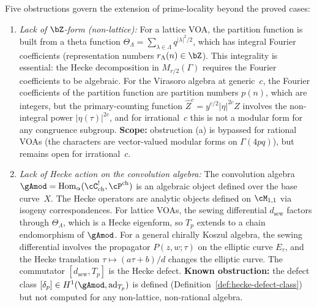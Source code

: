 \begin{theorem}%
\label{thm:prime-locality-obstructions}%
Five obstructions govern the extension of prime-locality beyond the
proved cases:
\begin{enumerate}[label=\textup{(\alph*)}]
\item \emph{Lack of $\bZ$-form \textup{(}non-lattice\textup{):}}
 For a lattice VOA, the partition function is built from a theta
 function $\Theta_\Lambda = \sum_{\lambda\in\Lambda} q^{|\lambda|^2/2}$,
 which has integral Fourier coefficients
 \textup{(}representation numbers $r_\Lambda(n) \in \bZ$\textup{)}.
 This integrality is essential: the Hecke decomposition in
 $M_{r/2}(\Gamma)$ requires the Fourier coefficients to be
 algebraic. For the Virasoro algebra at generic~$c$, the
 Fourier coefficients of the partition function are partition
 numbers $p(n)$, which are integers, but the primary-counting
 function $\widehat{Z}^c = y^{c/2}|\eta|^{2c}Z$ involves the
 non-integral power $|\eta(\tau)|^{2c}$, and for irrational~$c$
 this is not a modular form for any congruence subgroup.
 \textbf{Scope:} obstruction (a) is bypassed for rational VOAs
 \textup{(}the characters are vector-valued modular forms on
 $\Gamma(4pq)$\textup{)}, but remains open for
 irrational~$c$.

\item \emph{Lack of Hecke action on the convolution algebra:}
 The convolution algebra $\gAmod = \mathrm{Hom}_\alpha
 (\cC^!_{\mathrm{ch}}, \cP^{\mathrm{ch}})$ is an algebraic
 object defined over the base curve~$X$. The Hecke operators
 are analytic objects defined on $\cM_{1,1}$ via isogeny
 correspondences. For lattice VOAs, the sewing differential
 $d_{\mathrm{sew}}$ factors through $\Theta_\Lambda$, which is
 a Hecke eigenform, so $T_p$ extends to a chain endomorphism
 of $\gAmod$. For a general chirally Koszul algebra, the sewing
 differential involves the propagator $P(z,w;\tau)$ on the
 elliptic curve $E_\tau$, and the Hecke translation
 $\tau \mapsto (a\tau{+}b)/d$ changes the elliptic curve.
 The commutator $[d_{\mathrm{sew}}, T_p]$ is the Hecke defect.
 \textbf{Known obstruction:} the defect class
 $[\delta_p] \in H^1(\gAmod, \mathrm{ad}_{T_p})$ is defined
 \textup{(}Definition~\textup{\ref{def:hecke-defect-class}}\textup{)}
 but not computed for any non-lattice, non-rational algebra.


\end{enumerate}
\end{theorem}
